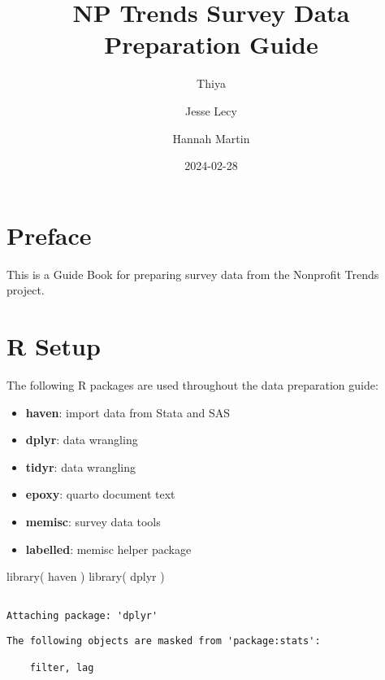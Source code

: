 \documentclass[
  letterpaper,
]{scrbook}
\title{NP Trends Survey Data Preparation Guide}
\author{Thiya \and Jesse Lecy \and Hannah Martin}
\date{2024-02-28}
\newenvironment{Shaded}{\begin{snugshade}}{\end{snugshade}}
\newcommand{\FunctionTok}[1]{\textcolor[rgb]{0.28,0.35,0.67}{#1}}
\newcommand{\NormalTok}[1]{\textcolor[rgb]{0.00,0.23,0.31}{#1}}
\providecommand{\tightlist}{%
  \setlength{\itemsep}{0pt}\setlength{\parskip}{0pt}}\usepackage{longtable,booktabs,array}
\renewcommand*\contentsname{Table of contents}
\newcommand\contentsname{Table of contents}
\begin{document}
\frontmatter
\maketitle

\renewcommand*\contentsname{Table of contents}
{
\setcounter{tocdepth}{2}
\tableofcontents
}
\mainmatter
{}

\chapter*{Preface}\label{preface}


This is a Guide Book for preparing survey data from the Nonprofit Trends
project.


\chapter{R Setup}\label{r-setup}

The following R packages are used throughout the data preparation guide:

\begin{itemize}
\tightlist
\item
  \textbf{haven}: import data from Stata and SAS
\item
  \textbf{dplyr}: data wrangling
\item
  \textbf{tidyr}: data wrangling
\item
  \textbf{epoxy}: quarto document text
\item
  \textbf{memisc}: survey data tools\\
\item
  \textbf{labelled}: memisc helper package
\end{itemize}

\begin{Shaded}
\begin{Highlighting}[]
\FunctionTok{library}\NormalTok{( haven )}
\FunctionTok{library}\NormalTok{( dplyr )}
\end{Highlighting}
\end{Shaded}

\begin{verbatim}

Attaching package: 'dplyr'
\end{verbatim}

\begin{verbatim}
The following objects are masked from 'package:stats':

    filter, lag
\end{verbatim}
\end{document}
